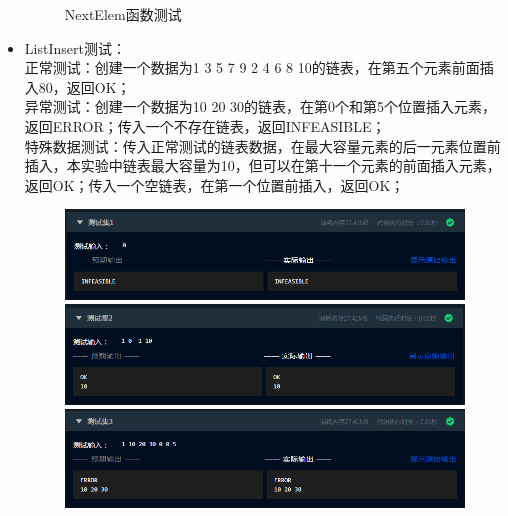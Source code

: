 \documentclass[supercite]{Experimental_Report}
\theoremstyle{definition}
\begin{document}
\begin{itemize}
\begin{figure}[htbp]
\begin{minipage}{0.9\linewidth}
		      \end{minipage}
		      \caption{NextElem函数测试}
		      \label{fig1-12}
	      \end{figure}
	\item ListInsert测试：\\
	      正常测试：创建一个数据为1 3 5 7 9 2 4 6 8 10的链表，在第五个元素前面插入80，返回OK；\\
	      异常测试：创建一个数据为10 20 30的链表，在第0个和第5个位置插入元素，返回ERROR；传入一个不存在链表，返回INFEASIBLE；\\
	      特殊数据测试：传入正常测试的链表数据，在最大容量元素的后一元素位置前插入，本实验中链表最大容量为10，但可以在第十一个元素的前面插入元素，返回OK；传入一个空链表，在第一个位置前插入，返回OK；
	      \begin{figure}[htbp]
		      \centering
		      \begin{minipage}{0.9\linewidth}
			      \centering
			      \includegraphics[width=0.9\linewidth]{images/test-27.png}
		      \end{minipage}
		      \begin{minipage}{0.9\linewidth}
			      \centering
			      \includegraphics[width=0.9\linewidth]{images/test-28.png}
		      \end{minipage}
		      \begin{minipage}{0.9\linewidth}
			      \centering
			      \includegraphics[width=0.9\linewidth]{images/test-29.png}
		      \end{minipage}
		      \begin{minipage}{0.9\linewidth}

\end{minipage}
\end{figure}
\end{itemize}
\end{document}
